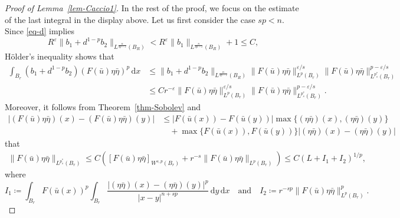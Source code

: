 \documentclass[11pt]{amsart}
\theoremstyle{plain}
\theoremstyle{definition}
\numberwithin{equation}{section}
\begin{document}
\begin{proof}[Proof of Lemma~\ref{lem-Caccio1}]
In the rest of the proof, we focus on the estimate of the last integral in the display above. Let us first consider the case $sp<n$. Since \eqref{eq-d} implies
\begin{equation}\label{eq-b}
R^\varepsilon \|b_1+d^{1-p}b_2\|_{L^{\frac{n}{sp-\varepsilon}}(B_R)} < R^\varepsilon \|b_1\|_{L^{\frac{n}{sp-\varepsilon}}(B_R)} + 1 \leq C,
\end{equation}
H\"older's inequality shows that
\begin{equation*}
\begin{split}
\int_{B_r} (b_1+d^{1-p}b_2) (F(\bar{u}) \eta\bar{\eta})^p \,\mathrm{d}x
&\leq \|b_1+d^{1-p}b_2\|_{L^{\frac{n}{sp-\varepsilon}}(B_R)} \|F(\bar{u})\eta\bar{\eta}\|_{L^p(B_r)}^{\varepsilon/s} \|F(\bar{u})\eta\bar{\eta}\|_{L^{p^{\ast}_{s}}(B_r)}^{p-\varepsilon/s} \\
&\leq C r^{-\varepsilon} \|F(\bar{u})\eta\bar{\eta}\|_{L^p(B_r)}^{\varepsilon/s} \|F(\bar{u})\eta\bar{\eta}\|_{L^{p^{\ast}_{s}}(B_r)}^{p-\varepsilon/s}.
\end{split}
\end{equation*}
Moreover, it follows from Theorem~\ref{thm-Sobolev} and
\begin{equation}\label{eq-triangle}
\begin{split}
|(F(\bar{u})\eta\bar{\eta})(x)-(F(\bar{u})\eta\bar{\eta})(y)|
&\leq |F(\bar{u}(x))-F(\bar{u}(y))| \max\{(\eta\bar{\eta})(x), (\eta\bar{\eta})(y)\} \\
&\quad + \max\{F(\bar{u}(x)), F(\bar{u}(y)) \} |(\eta\bar{\eta})(x)-(\eta\bar{\eta})(y)|
\end{split}
\end{equation}
that
\begin{equation*}
\begin{split}
\|F(\bar{u})\eta\bar{\eta}\|_{L^{p^{\ast}_{s}}(B_r)} \leq C \left( [F(\bar{u})\eta\bar{\eta}]_{W^{s, p}(B_r)} + r^{-s}\|F(\bar{u})\eta\bar{\eta}\|_{L^p(B_r)} \right) \leq C(L + I_1 + I_2)^{1/p},
\end{split}
\end{equation*}
where
\begin{equation*}
I_1 \coloneqq \int_{B_r} F(\bar{u}(x))^p \int_{B_r} \frac{|(\eta\bar{\eta})(x)-(\eta\bar{\eta})(y)|^p}{|x-y|^{n+sp}} \,\mathrm{d}y\,\mathrm{d}x \quad\text{and}\quad I_2 \coloneqq r^{-sp} \|F(\bar{u})\eta\bar{\eta}\|_{L^p(B_r)}^p.
\end{equation*}


\end{proof}
\end{document}
